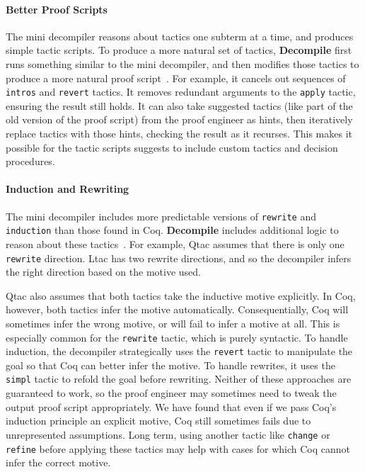 \paragraph{Better Proof Scripts}
The mini decompiler reasons about tactics one subterm at a time, and produces simple tactic scripts.
To produce a more natural set of tactics, \textbf{Decompile} first runs something similar to the mini decompiler, and then modifies those tactics to produce a more natural proof script~. %
For example, it cancels out sequences of \lstinline{intros} and \lstinline{revert} tactics.
It removes redundant arguments to the \lstinline{apply} tactic, ensuring the result still holds. %
It can also take suggested tactics (like part of the old version of the proof script) from the proof engineer as hints,
then iteratively replace tactics with those hints, checking the result as it recurses.
This makes it possible for the tactic scripts \toolname suggests to include custom tactics and decision procedures.

\paragraph{Induction and Rewriting}
The mini decompiler includes more predictable versions of \lstinline{rewrite} and \lstinline{induction}
than those found in Coq. \textbf{Decompile} includes additional logic to reason about these tactics~. %
For example, Qtac assumes that there is only one \lstinline{rewrite} direction. Ltac has two rewrite directions,
and so the decompiler infers the right direction based on the motive used.

Qtac also assumes that both tactics take the inductive motive explicitly.
In Coq, however, both tactics infer the motive automatically.
Consequentially, Coq will sometimes infer the wrong motive, %
or will fail to infer a motive at all.
This is especially common for the \lstinline{rewrite} tactic, which is purely syntactic.
To handle induction, the decompiler strategically uses the \lstinline{revert} tactic to manipulate the goal
so that Coq can better infer the motive.
To handle rewrites, it uses the \lstinline{simpl} tactic to refold the goal before rewriting.
Neither of these approaches are guaranteed to work, so the proof engineer may sometimes need to tweak the output proof script appropriately.
We have found that even if we pass Coq's induction principle an explicit motive, Coq still sometimes fails due
to unrepresented assumptions.
Long term, using another tactic like \lstinline{change} or \lstinline{refine} before applying these tactics
may help with cases for which Coq cannot infer the correct motive.

